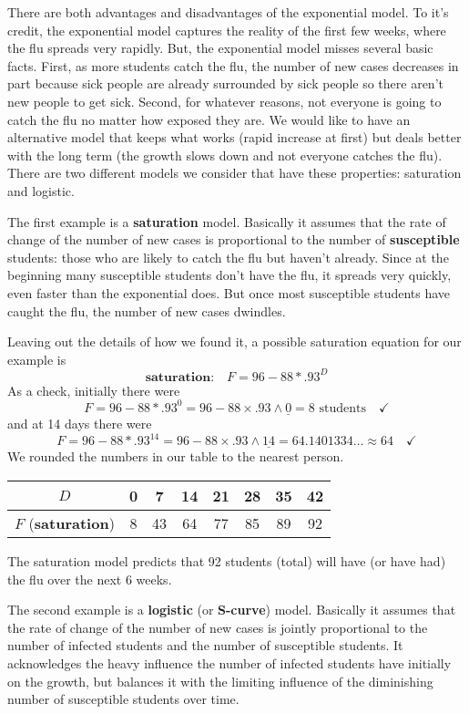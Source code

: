 There are both advantages and disadvantages of the exponential model.  To it's credit, the exponential model captures the reality of the first few weeks, where the flu spreads very rapidly.  But, the exponential model misses several basic facts.  First, as more students catch the flu, the number of new cases decreases in part because sick people are already surrounded by sick people so there aren't new people to get sick.  Second, for whatever reasons, not everyone is going to catch the flu no matter how exposed they are.  We would like to have an alternative model that keeps what works (rapid increase at first) but deals better with the long term (the growth slows down and not everyone catches the flu).  There are two different models we consider that have these properties:  saturation and logistic.

The first example is a \textbf{saturation} model.  Basically it assumes that the rate of change of the number of new cases is proportional to the number of \textbf{susceptible} students: those who are likely to catch the flu but haven't already.  Since at the beginning many susceptible students don't have the flu, it spreads very quickly, even faster than the exponential does.  But once most susceptible students have caught the flu, the number of new cases dwindles.  

Leaving out the details of how we found it, a possible saturation equation for our example is
$$\textbf{saturation:} \quad F=96-88\ast.93^D$$  
As a check, initially there were
$$F = 96-88 \ast .93^0 = 96 - 88 \times .93 \wedge \underline{0} = 8 \text{ students} \quad \checkmark$$
and at 14 days there were
$$F = 96-88 \ast .93^{14} = 96 - 88 \times .93 \wedge \underline{14} =64.1401334\ldots \approx 64 \quad \checkmark$$
We rounded the numbers in our table to the nearest person. 
\begin{center}
\begin{tabular} {|c| |c|c|c  |c|c| c|c|}\hline
$D$ & 0 & 7 & 14 & 21 & 28 & 35 & 42 \\ \hline
$F$ (\textbf{saturation}) & 8 & 43 & 64 & 77 & 85 & 89 &92 \\ \hline
\end{tabular}
\end{center}
The saturation model predicts that 92 students (total) will have (or have had) the flu over the next 6 weeks.

The second example is a \textbf{logistic} (or \textbf{S-curve}) model.  Basically it assumes that the rate of change of the number of new cases is jointly proportional to the number of infected students and the number of susceptible students.  It acknowledges the heavy influence the number of infected students have initially on the growth, but balances it with the limiting influence of the diminishing number of susceptible students over time.

